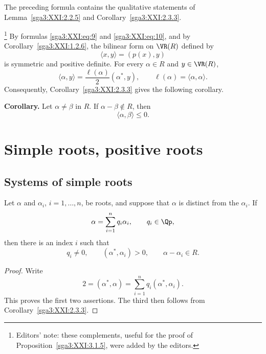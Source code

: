 \begin{remark}\label{sga3:XXI:2.3.6}
The preceding formula contains the qualitative statements of
Lemma~\ref{sga3:XXI:2.2.5} and
Corollary~\ref{sga3:XXI:2.3.3}.
\end{remark}

\begin{complements}\label{sga3:XXI:2.3.7}
\footnote{Editors' note: these complements, useful for the proof of
Proposition~\ref{sga3:XXI:3.1.5}, were added by the editors.}
By formulas \eqref{sga3:XXI:eq:9} and
\eqref{sga3:XXI:eq:10}, and by
Corollary~\ref{sga3:XXI:1.2.6}, the bilinear form on \(\VR(R)\)
defined by
\[
 \langle x,y\rangle=(p(x),y)
\]
is symmetric and positive definite. For every \(\alpha\in R\) and
\(y\in\VR(R)\),
\[
 \langle\alpha,y\rangle
 =\frac{\ell(\alpha)}2(\alpha^\ast,y),
 \qquad
 \ell(\alpha)=\langle\alpha,\alpha\rangle.
\]
Consequently, Corollary~\ref{sga3:XXI:2.3.3} gives the following
corollary.

\medskip
\noindent\textbf{Corollary.}\quad
{}
Let \(\alpha\neq\beta\) in \(R\). If \(\alpha-\beta\notin R\), then
\[
 \langle\alpha,\beta\rangle\leq0.
\]
\end{complements}

\section{Simple roots, positive roots}

\subsection{Systems of simple roots}

\begin{lemma}\label{sga3:XXI:3.1.1}
Let \(\alpha\) and \(\alpha_i\), \(i=1,\ldots,n\), be roots, and
suppose that \(\alpha\) is distinct from the \(\alpha_i\). If
\[
 \alpha=\sum_{i=1}^n q_i\alpha_i,
 \qquad q_i\in\Qp,
\]
then there is an index \(i\) such that
\[
 q_i\neq0,\qquad(\alpha^\ast,\alpha_i)>0,\qquad
 \alpha-\alpha_i\in R.
\]
\end{lemma}

\begin{proof}
Write
\[
 2=(\alpha^\ast,\alpha)
   =\sum_{i=1}^n q_i(\alpha^\ast,\alpha_i).
\]
This proves the first two assertions. The third then follows from
Corollary~\ref{sga3:XXI:2.3.3}.
\end{proof}


